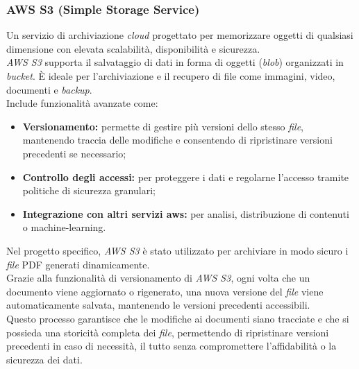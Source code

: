 \subsubsection{AWS S3 (Simple Storage Service)}

Un servizio di archiviazione \textit{cloud} progettato per memorizzare oggetti di qualsiasi dimensione con elevata scalabilità, disponibilità e sicurezza.\\
\textit{AWS S3} supporta il salvataggio di dati in forma di oggetti (\textit{blob}) organizzati in \textit{bucket}. È ideale per l’archiviazione e il recupero di file come immagini, video, documenti e \textit{backup}.\\

\noindent Include funzionalità avanzate come:
\begin{itemize}
    \item \textbf{Versionamento:} permette di gestire più versioni dello stesso \textit{file}, mantenendo traccia delle modifiche e consentendo di ripristinare versioni precedenti se necessario;
    \item \textbf{Controllo degli accessi:} per proteggere i dati e regolarne l'accesso tramite politiche di sicurezza granulari;
    \item \textbf{Integrazione con altri servizi \gls{aws}:} per analisi, distribuzione di contenuti o \gls{machine-learning}.
\end{itemize}

\noindent Nel progetto specifico, \textit{AWS S3} è stato utilizzato per archiviare in modo sicuro i \textit{file} PDF generati dinamicamente.\\
Grazie alla funzionalità di versionamento di \textit{AWS S3}, ogni volta che un documento viene aggiornato o rigenerato, una nuova versione del \textit{file} viene automaticamente salvata, mantenendo le versioni precedenti accessibili.\\
Questo processo garantisce che le modifiche ai documenti siano tracciate e che si possieda una storicità completa dei \textit{file}, permettendo di ripristinare versioni precedenti in caso di necessità, il tutto senza compromettere l'affidabilità o la sicurezza dei dati.